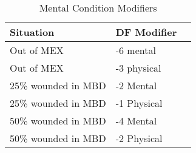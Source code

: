 \begin{table}[h]
	\begin{tabular}{lll}
	Situation			& DF Modifier	\\
	\hline
	Out of MEX 			& -6 mental 	\\
	Out of MEX			& -3 physical	\\
	25\% wounded in MBD & -2 Mental		\\
	25\% wounded in MBD	& -1 Physical 	\\
	50\% wounded in MBD & -4 Mental		\\
	50\% wounded in MBD & -2 Physical	\\

    \end{tabular}
    \caption{Mental Condition Modifiers}
\end{table}
